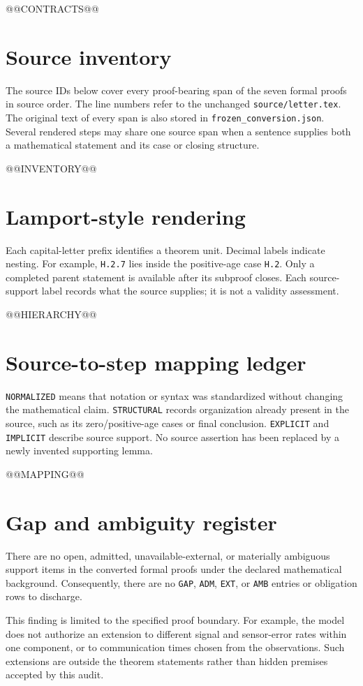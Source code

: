 \documentclass[11pt,letterpaper]{article}
\begin{document}
@@CONTRACTS@@

\section{Source inventory}
The source IDs below cover every proof-bearing span of the seven formal proofs in source order. The line numbers refer to the unchanged \texttt{source/letter.tex}. The original text of every span is also stored in \texttt{frozen\_conversion.json}. Several rendered steps may share one source span when a sentence supplies both a mathematical statement and its case or closing structure.

{\footnotesize @@INVENTORY@@}

\section{Lamport-style rendering}
Each capital-letter prefix identifies a theorem unit. Decimal labels indicate nesting. For example, \texttt{H.2.7} lies inside the positive-age case \texttt{H.2}. Only a completed parent statement is available after its subproof closes. Each source-support label records what the source supplies; it is not a validity assessment.

@@HIERARCHY@@

\section{Source-to-step mapping ledger}
\texttt{NORMALIZED} means that notation or syntax was standardized without changing the mathematical claim. \texttt{STRUCTURAL} records organization already present in the source, such as its zero/positive-age cases or final conclusion. \texttt{EXPLICIT} and \texttt{IMPLICIT} describe source support. No source assertion has been replaced by a newly invented supporting lemma.

{\footnotesize @@MAPPING@@}

\section{Gap and ambiguity register}
There are no open, admitted, unavailable-external, or materially ambiguous support items in the converted formal proofs under the declared mathematical background. Consequently, there are no \texttt{GAP}, \texttt{ADM}, \texttt{EXT}, or \texttt{AMB} entries or obligation rows to discharge.

This finding is limited to the specified proof boundary. For example, the model does not authorize an extension to different signal and sensor-error rates within one component, or to communication times chosen from the observations. Such extensions are outside the theorem statements rather than hidden premises accepted by this audit.
\end{document}
